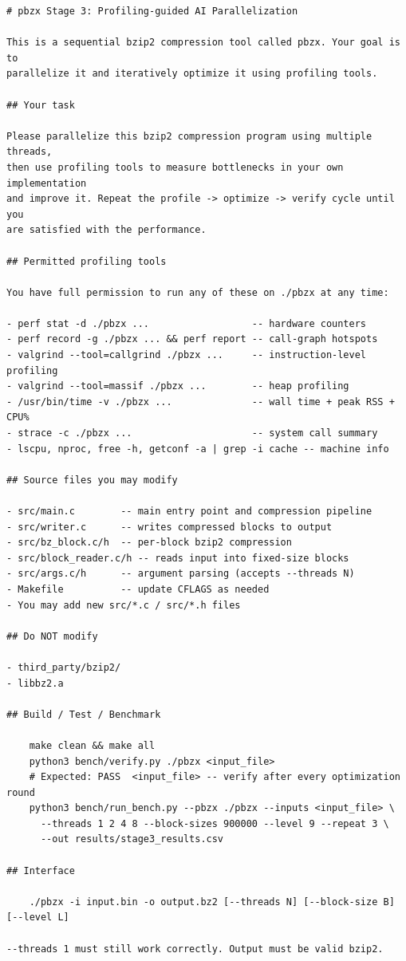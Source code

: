 \documentclass[conference]{IEEEtran}
\begin{document}
\begin{lstlisting}
# pbzx Stage 3: Profiling-guided AI Parallelization

This is a sequential bzip2 compression tool called pbzx. Your goal is to
parallelize it and iteratively optimize it using profiling tools.

## Your task

Please parallelize this bzip2 compression program using multiple threads,
then use profiling tools to measure bottlenecks in your own implementation
and improve it. Repeat the profile -> optimize -> verify cycle until you
are satisfied with the performance.

## Permitted profiling tools

You have full permission to run any of these on ./pbzx at any time:

- perf stat -d ./pbzx ...                  -- hardware counters
- perf record -g ./pbzx ... && perf report -- call-graph hotspots
- valgrind --tool=callgrind ./pbzx ...     -- instruction-level profiling
- valgrind --tool=massif ./pbzx ...        -- heap profiling
- /usr/bin/time -v ./pbzx ...              -- wall time + peak RSS + CPU%
- strace -c ./pbzx ...                     -- system call summary
- lscpu, nproc, free -h, getconf -a | grep -i cache -- machine info

## Source files you may modify

- src/main.c        -- main entry point and compression pipeline
- src/writer.c      -- writes compressed blocks to output
- src/bz_block.c/h  -- per-block bzip2 compression
- src/block_reader.c/h -- reads input into fixed-size blocks
- src/args.c/h      -- argument parsing (accepts --threads N)
- Makefile          -- update CFLAGS as needed
- You may add new src/*.c / src/*.h files

## Do NOT modify

- third_party/bzip2/
- libbz2.a

## Build / Test / Benchmark

    make clean && make all
    python3 bench/verify.py ./pbzx <input_file>
    # Expected: PASS  <input_file> -- verify after every optimization round
    python3 bench/run_bench.py --pbzx ./pbzx --inputs <input_file> \
      --threads 1 2 4 8 --block-sizes 900000 --level 9 --repeat 3 \
      --out results/stage3_results.csv

## Interface

    ./pbzx -i input.bin -o output.bz2 [--threads N] [--block-size B] [--level L]

--threads 1 must still work correctly. Output must be valid bzip2.
\end{lstlisting}
\end{document}
